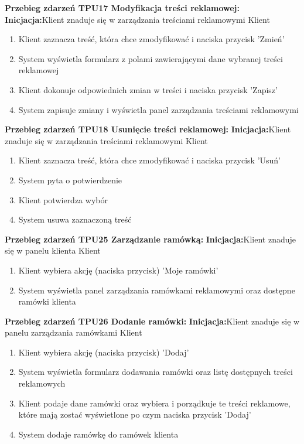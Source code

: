 \documentclass[10pt,a4paper,titlepage]{article} %
\begin{document}
		{\bf Przebieg zdarzeń TPU17 Modyfikacja treści reklamowej:}\newline
		{\bf Inicjacja:}Klient znaduje się w zarządzania treściami reklamowymi
		 Klient
			\begin{enumerate}
			  \item Klient zaznacza treść, która chce zmodyfikować i naciska przycisk
			  'Zmień'
			  \item System wyświetla formularz z polami zawierającymi dane wybranej
			  treści reklamowej
			  \item Klient dokonuje odpowiednich zmian w treści i naciska przycisk
			  'Zapisz'
			  \item System zapisuje zmiany i wyświetla panel zarządzania treściami
			  reklamowymi
			\end{enumerate}
			
		{\bf Przebieg zdarzeń TPU18 Usunięcie treści reklamowej:}\newline
		{\bf Inicjacja:}Klient znaduje się w zarządzania treściami reklamowymi
		 Klient
			\begin{enumerate}
			  \item Klient zaznacza treść, która chce zmodyfikować i naciska przycisk
			  'Usuń'
			  \item System pyta o potwierdzenie
			  \item Klient potwierdza wybór
			  \item System usuwa zaznaczoną treść
			\end{enumerate}
			
		{\bf Przebieg zdarzeń TPU25 Zarządzanie ramówką:}\newline
		{\bf Inicjacja:}Klient znaduje się w panelu klienta
		 Klient
			\begin{enumerate}
			  \item Klient wybiera akcję (naciska przycisk) 'Moje ramówki'
			  \item System wyświetla panel zarządzania ramówkami reklamowymi oraz
			  dostępne ramówki klienta
			\end{enumerate}
			
		{\bf Przebieg zdarzeń TPU26 Dodanie ramówki:}\newline
		{\bf Inicjacja:}Klient znaduje się w panelu zarządzania ramówkami
		 Klient
			\begin{enumerate}
			  \item Klient wybiera akcję (naciska przycisk) 'Dodaj'
			  \item System wyświetla formularz dodawania ramówki oraz listę dostępnych
			  treści reklamowych
			  \item Klient podaje dane ramówki oraz wybiera i porządkuje te treści 
			  reklamowe, które mają zostać wyświetlone po czym naciska przycisk 'Dodaj'
			  \item System dodaje ramówkę do ramówek klienta
			\end{enumerate}
			
\end{document}
